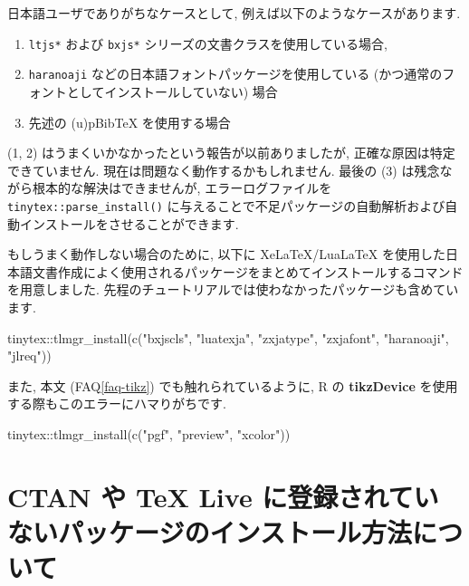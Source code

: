 \documentclass[
  xelatex,ja=standard,jafont=noto]{bxjsreport}
\newenvironment{Shaded}{\begin{snugshade}}{\end{snugshade}}
\newcommand{\FunctionTok}[1]{\textcolor[rgb]{0.00,0.00,0.00}{#1}}
\newcommand{\NormalTok}[1]{#1}
\newcommand{\SpecialCharTok}[1]{\textcolor[rgb]{0.00,0.00,0.00}{#1}}
\newcommand{\StringTok}[1]{\textcolor[rgb]{0.31,0.60,0.02}{#1}}
\providecommand{\tightlist}{%
  \setlength{\itemsep}{0pt}\setlength{\parskip}{0pt}}
\begin{document}
日本語ユーザでありがちなケースとして,
例えば以下のようなケースがあります.

\begin{enumerate}
\def\labelenumi{\arabic{enumi}.}
\tightlist
\item
  \texttt{ltjs*} および \texttt{bxjs*}
  シリーズの文書クラスを使用している場合,
\item
  \texttt{haranoaji} などの日本語フォントパッケージを使用している
  (かつ通常のフォントとしてインストールしていない) 場合
\item
  先述の (u)pBibTeX を使用する場合
\end{enumerate}

(1, 2) はうまくいかなかったという報告が以前ありましたが,
正確な原因は特定できていません. 現在は問題なく動作するかもしれません.
最後の (3) は残念ながら根本的な解決はできませんが, エラーログファイルを
\texttt{tinytex::parse\_install()}
に与えることで不足パッケージの自動解析および自動インストールをさせることができます.

もしうまく動作しない場合のために, 以下に XeLaTeX/LuaLaTeX
を使用した日本語文書作成によく使用されるパッケージをまとめてインストールするコマンドを用意しました.
先程のチュートリアルでは使わなかったパッケージも含めています.

\begin{Shaded}
\begin{Highlighting}[numbers=left,,]
\NormalTok{tinytex}\SpecialCharTok{::}\FunctionTok{tlmgr\_install}\NormalTok{(}\FunctionTok{c}\NormalTok{(}\StringTok{"bxjscls"}\NormalTok{, }\StringTok{"luatexja"}\NormalTok{, }\StringTok{"zxjatype"}\NormalTok{, }\StringTok{"zxjafont"}\NormalTok{, }\StringTok{"haranoaji"}\NormalTok{, }\StringTok{"jlreq"}\NormalTok{))}
\end{Highlighting}
\end{Shaded}

また, 本文 (FAQ\ref{faq-tikz}) でも触れられているように, R の
\textbf{tikzDevice} を使用する際もこのエラーにハマりがちです.

\begin{Shaded}
\begin{Highlighting}[numbers=left,,]
\NormalTok{tinytex}\SpecialCharTok{::}\FunctionTok{tlmgr\_install}\NormalTok{(}\FunctionTok{c}\NormalTok{(}\StringTok{"pgf"}\NormalTok{, }\StringTok{"preview"}\NormalTok{, }\StringTok{"xcolor"}\NormalTok{))}
\end{Highlighting}
\end{Shaded}

\hypertarget{ctan-ux3084-tex-live-ux306bux767bux9332ux3055ux308cux3066ux3044ux306aux3044ux30d1ux30c3ux30b1ux30fcux30b8ux306eux30a4ux30f3ux30b9ux30c8ux30fcux30ebux65b9ux6cd5ux306bux3064ux3044ux3066}{%
\section{CTAN や TeX Live
に登録されていないパッケージのインストール方法について}\label{ctan-ux3084-tex-live-ux306bux767bux9332ux3055ux308cux3066ux3044ux306aux3044ux30d1ux30c3ux30b1ux30fcux30b8ux306eux30a4ux30f3ux30b9ux30c8ux30fcux30ebux65b9ux6cd5ux306bux3064ux3044ux3066}}
\end{document}
